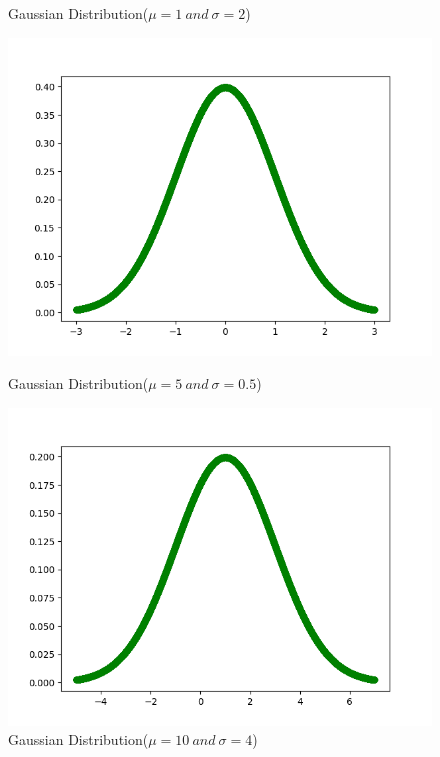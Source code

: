 \documentclass[10pt]{article}
\begin{document}
\begin{enumerate}[label=2.\arabic*]
\begin{figure}[htbp]
\begin{minipage}[c]{0.5\textwidth}
    		\caption{Gaussian Distribution($\mu=1\ and\ \sigma=2$)}
    	\end{minipage}
    \end{figure}
	\begin{figure}[htbp]
 	\centering
 	\begin{minipage}[c]{0.5\textwidth} %
 		\centering
 		\includegraphics[width=1\linewidth]{./gaussian/0.png}
 		\caption{Gaussian Distribution($\mu=5\ and\ \sigma=0.5$)}
 	\end{minipage}%
 	\begin{minipage}[c]{0.5\textwidth}
 		\centering
 		\includegraphics[width=1\textwidth]{./gaussian/1.png}
 		\caption{Gaussian Distribution($\mu=10\ and\ \sigma=4$)}

\end{minipage}
\end{figure}
\end{enumerate}
\end{document}
